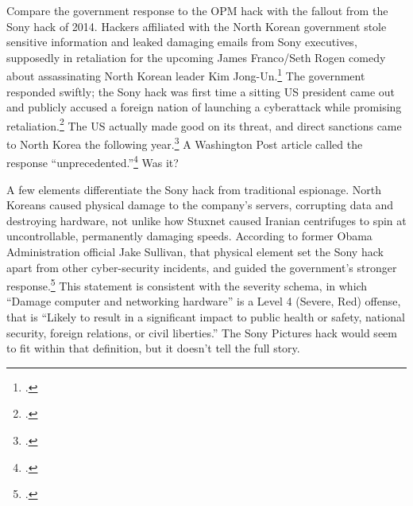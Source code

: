 \documentclass{memoir}
\begin{document}
\begin{refsegment}

Compare the government response to the OPM hack with the fallout from the Sony hack of 2014. Hackers affiliated with the North Korean government stole sensitive information and leaked damaging emails from Sony executives, supposedly in retaliation for the upcoming James Franco/Seth Rogen comedy about assassinating North Korean leader Kim Jong-Un.\footcite{barnes_sony_2017} The government responded swiftly; the Sony hack was first time a sitting US president came out and publicly accused a foreign nation of launching a cyberattack while promising retaliation.\footcite{sanger_u.s._2016} The US actually made good on its threat, and direct sanctions came to North Korea the following year.\footcite{lederman_us_2015} A Washington Post article called the response ``unprecedented.''\footcite{nakashima_why_2015} Was it?

A few elements differentiate the Sony hack from traditional espionage. North Koreans caused physical damage to the company's servers, corrupting data and destroying hardware, not unlike how Stuxnet caused Iranian centrifuges to spin at uncontrollable, permanently damaging speeds. According to former Obama Administration official Jake Sullivan, that physical element set the Sony hack apart from other cyber-security incidents, and guided the government's stronger response.\footcite[Jake Sullivan served as the Deputy Assistant to the President and National Security Advisor to the Vice President. Piror to that, he was the Director of Policy Planning at the State Department.]{sullivan_personal_2019} This statement is consistent with the severity schema, in which ``Damage computer and networking hardware'' is a Level 4 (Severe, Red) offense, that is ``Likely to result in a significant impact to public health or safety, national security, foreign relations, or civil liberties.'' The Sony Pictures hack would seem to fit within that definition, but it doesn't tell the full story.


\end{refsegment}
\end{document}

